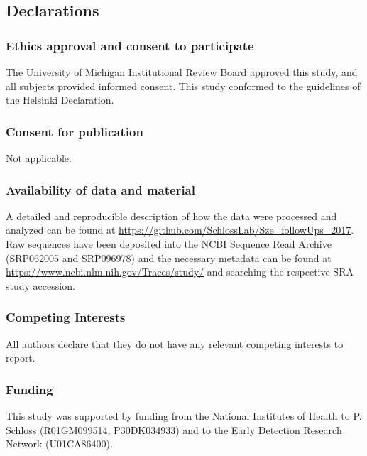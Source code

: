 \documentclass[12pt,]{article}
\begin{document}
\newpage

\subsection{Declarations}\label{declarations}

\subsubsection{Ethics approval and consent to
participate}\label{ethics-approval-and-consent-to-participate}

The University of Michigan Institutional Review Board approved this
study, and all subjects provided informed consent. This study conformed
to the guidelines of the Helsinki Declaration.

\subsubsection{Consent for publication}\label{consent-for-publication}

Not applicable.

\subsubsection{Availability of data and
material}\label{availability-of-data-and-material}

A detailed and reproducible description of how the data were processed
and analyzed can be found at
\url{https://github.com/SchlossLab/Sze_followUps_2017}. Raw sequences
have been deposited into the NCBI Sequence Read Archive (SRP062005 and
SRP096978) and the necessary metadata can be found at
\url{https://www.ncbi.nlm.nih.gov/Traces/study/} and searching the
respective SRA study accession.

\subsubsection{Competing Interests}\label{competing-interests}

All authors declare that they do not have any relevant competing
interests to report.

\subsubsection{Funding}\label{funding}

This study was supported by funding from the National Institutes of
Health to P. Schloss (R01GM099514, P30DK034933) and to the Early
Detection Research Network (U01CA86400).
\end{document}
